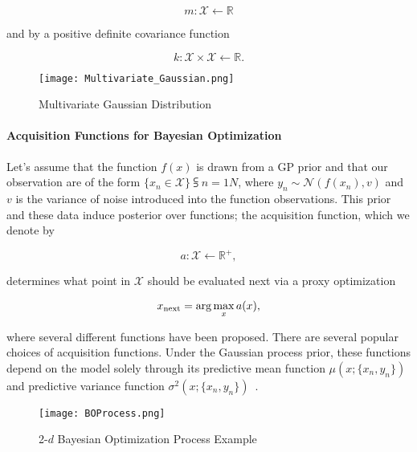 \begin{equation}
	m : \mathcal{X} \leftarrow \mathbb{R}
\end{equation}

and by a positive definite covariance function 

\begin{equation}
	k : \mathcal{X} \times \mathcal{X} \leftarrow \mathbb{R}.
\end{equation}

\begin{figure} [h!]
	\centering
	\texttt{[image: Multivariate\_Gaussian.png]}
	\caption{Multivariate Gaussian Distribution~\cite{MNDWikipedia}}
	\label{fig:Multivatiate_Gaussian}
\end{figure}

\paragraph{Acquisition Functions for Bayesian Optimization} Let's assume that the function $f(x)$ is drawn from a GP prior and that our observation are of the form $\{x_n \in \mathcal{X}\}\subsup{}{ n=1}{N}$, where $y_n \sim \mathcal{N}(f(x_n), v)$ and $v$ is the variance of noise introduced into the function observations. This prior and these data induce  posterior over functions; the acquisition function, which we denote by

\begin{equation}
	a : \mathcal{X} \leftarrow \mathbb{R}^+,
\end{equation}

determines what point in $\mathcal{X}$ should be evaluated next via a proxy optimization

\begin{equation}
	x\textsubscript{next} = \arg\max_{x}a(x),
\end{equation}

where several different functions have been proposed. There are several popular choices of acquisition functions. Under the Gaussian process prior, these functions depend on the model solely through its predictive mean function $\mu(x; \{x_n, y_n\})$ and predictive variance function $\sigma^2(x; \{x_n, y_n\})$~\cite{NIPS2012_4522}.


\begin{figure} [h!]
	\centering
	\texttt{[image: BOProcess.png]}
	\caption{2-$d$ Bayesian Optimization Process Example~\cite{BayesianOptimizationImage}}
	\label{fig:BoProcess}
\end{figure}

